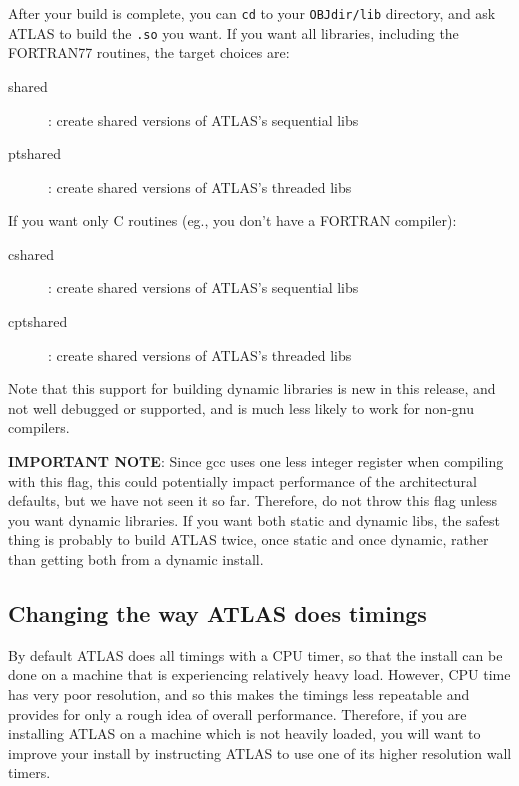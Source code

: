 \documentclass[11pt]{article}
\begin{document}
After your build is complete, you can {\tt cd} to your {\tt OBJdir/lib} 
directory, and
ask ATLAS to build the {\tt .so} you want.  If you want all libraries, including
the FORTRAN77 routines, the target choices are:
\begin{description}
\item [shared] : create shared versions of ATLAS's sequential libs
\item [ptshared] : create shared versions of ATLAS's threaded libs
\end{description}
If you want only C routines (eg., you don't have a FORTRAN compiler):
\begin{description}
\item [cshared] : create shared versions of ATLAS's sequential libs
\item [cptshared] : create shared versions of ATLAS's threaded libs
\end{description}

Note that this support for building dynamic libraries is new in this release,
and not well debugged or supported, and is much less likely to work for
non-gnu compilers.

\textbf{IMPORTANT NOTE}: Since gcc uses one less integer register when
      compiling with this flag, this
      could potentially impact performance of the architectural defaults,
      but we have not seen it so far.  Therefore, do not throw this flag
      unless you want dynamic libraries.  If you want both static and dynamic
      libs, the safest thing is probably to build ATLAS twice, once static
      and once dynamic, rather than getting both from a dynamic install.


\subsection{Changing the way ATLAS does timings}
\label{sec-time-flags}

By default ATLAS does all timings with a CPU timer, so that the install
can be done on a machine that is experiencing relatively heavy load.  However,
CPU time has very poor resolution, and so this makes the timings less repeatable
and provides for only a rough idea of overall performance.  Therefore, if
you are installing ATLAS on a machine which is not heavily loaded, you will
want to improve your install by instructing ATLAS to use one of its higher
resolution wall timers.
\end{document}
